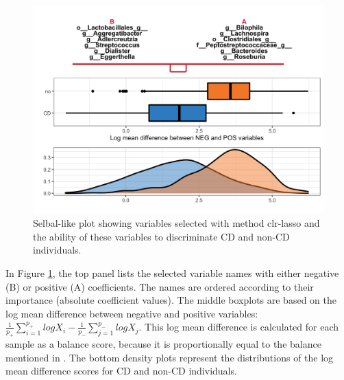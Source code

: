 \documentclass[openany]{book}
\newenvironment{Shaded}{\begin{snugshade}}{\end{snugshade}}
\newcommand{\KeywordTok}[1]{\textcolor[rgb]{0.13,0.29,0.53}{\textbf{#1}}}
\newcommand{\DataTypeTok}[1]{\textcolor[rgb]{0.13,0.29,0.53}{#1}}
\newcommand{\StringTok}[1]{\textcolor[rgb]{0.31,0.60,0.02}{#1}}
\newcommand{\CommentTok}[1]{\textcolor[rgb]{0.56,0.35,0.01}{\textit{#1}}}
\newcommand{\OperatorTok}[1]{\textcolor[rgb]{0.81,0.36,0.00}{\textbf{#1}}}
\newcommand{\NormalTok}[1]{#1}
\begin{document}
\begin{figure}

{\centering \includegraphics[width=1\linewidth]{./Generated_plots/clrCD-1} 

}

\caption{Selbal-like plot showing variables selected with method clr-lasso and the ability of these variables to discriminate CD and non-CD individuals.}\label{fig:clrCD}
\end{figure}

In Figure \ref{fig:clrCD}, the top panel lists the selected variable
names with either negative (B) or positive (A) coefficients. The names
are ordered according to their importance (absolute coefficient values).
The middle boxplots are based on the log mean difference between
negative and positive variables:
\(\frac{1}{p_{+}}\sum_{i=1}^{p_{+}}logX_{i} - \frac{1}{p_{-}}\sum_{j=1}^{p_{-}}logX_{j}\).
This log mean difference is calculated for each sample as a balance
score, because it is proportionally equal to the balance mentioned in
\citep{rivera2018balances}. The bottom density plots represent the
distributions of the log mean difference scores for CD and non-CD
individuals.

\begin{Shaded}
\end{Shaded}
\end{document}
